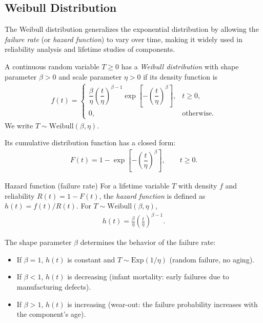 \subsection{Weibull Distribution}

The Weibull distribution generalizes the exponential distribution by allowing the
\emph{failure rate} (or \emph{hazard function}) to vary over time, making it widely used
in reliability analysis and lifetime studies of components.

\begin{definicion}
A continuous random variable $T \geq 0$ has a \emph{Weibull distribution} with shape
parameter $\beta > 0$ and scale parameter $\eta > 0$ if its density function is
\begin{align}
 \label{eq:2.8.18}
 f(t) =
 \begin{cases}
  \dfrac{\beta}{\eta}\left(\dfrac{t}{\eta}\right)^{\beta-1}
  \exp\!\left[-\left(\dfrac{t}{\eta}\right)^{\beta}\right], & t \geq 0, \\
  0, & \text{otherwise.}
 \end{cases}
\end{align}
We write $T \sim \text{Weibull}(\beta,\eta)$.
\end{definicion}

Its cumulative distribution function has a closed form:
\begin{align}
 \label{eq:2.8.19}
 F(t) = 1 - \exp\!\left[-\left(\dfrac{t}{\eta}\right)^{\beta}\right], \qquad t \geq 0.
\end{align}

{Hazard function (failure rate)} For a lifetime variable $T$ with density $f$ and
reliability $R(t) = 1 - F(t)$, the \emph{hazard function} is defined as $h(t) =
f(t)/R(t)$. For $T \sim \text{Weibull}(\beta,\eta)$,
\begin{align}
 \label{eq:2.8.20}
 h(t) = \frac{\beta}{\eta}\left(\frac{t}{\eta}\right)^{\beta-1}.
\end{align}

\begin{observacion}
The shape parameter $\beta$ determines the behavior of the failure rate:
\begin{itemize}
 \item If $\beta = 1$, $h(t)$ is constant and $T \sim \text{Exp}(1/\eta)$ (random
 failure, no aging).
 \item If $\beta < 1$, $h(t)$ is decreasing (infant mortality: early failures due to
 manufacturing defects).
 \item If $\beta > 1$, $h(t)$ is increasing (wear-out: the failure probability
 increases with the component's age).
\end{itemize}
\end{observacion}


